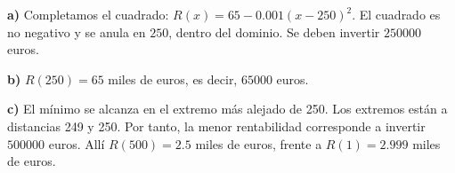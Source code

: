 \textbf{a)} Completamos el cuadrado:
$R(x)=65-0.001(x-250)^2$.
El cuadrado es no negativo y se anula en $250$, dentro del
dominio. Se deben invertir $\boxed{250000}$ euros.

\textbf{b)} $R(250)=65$ miles de euros, es decir, $\boxed{65000}$ euros.

\textbf{c)} El mínimo se alcanza en el extremo más alejado
de 250. Los extremos están a distancias 249 y 250.
Por tanto, la menor rentabilidad corresponde a invertir
$\boxed{500000}$ euros. Allí $R(500)=2.5$ miles de euros,
frente a $R(1)=2.999$ miles de euros.
